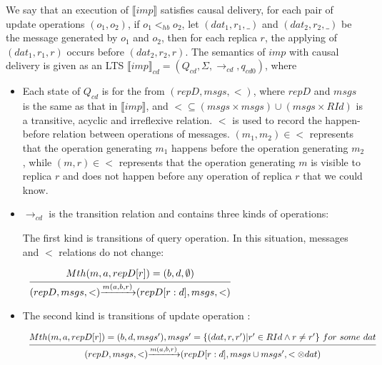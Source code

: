 We say that an execution of $\llbracket imp \rrbracket$ satisfies causal delivery, for each pair of update operations $(o_1,o_2)$, if $o_1 <_{hb} o_2$, let $(dat_1,r_1,\_)$ and $(dat_2,r_2,\_)$ be the message generated by $o_1$ and $o_2$, then for each replica $r$, the applying of $(dat_1,r_1,r)$ occurs before $(dat_2,r_2,r)$. The semantics of $imp$ with causal delivery is given as an LTS $\llbracket imp \rrbracket_{cd} = (Q_{cd},\Sigma,\rightarrow_{cd},q_{cd0})$, where

\begin {itemize}
\setlength{\itemsep}{0.5pt}
\item[-] Each state of $Q_{cd}$ is for the from $(repD,msgs,<)$, where $repD$ and $msgs$ is the same as that in $\llbracket imp \rrbracket$, and $< \subseteq (msgs \times msgs) \cup (msgs \times RId)$ is a transitive, acyclic and irreflexive relation. $<$ is used to record the happen-before relation between operations of messages. %
    $(m_1,m_2) \in <$ represents that the operation generating $m_1$ happens before the operation generating $m_2$, while $(m,r) \in <$ represents that the operation generating $m$ is visible to replica $r$ and does not happen before any operation of replica $r$ that we could know.

\item[-] $\rightarrow_{cd}$ is the transition relation and contains three kinds of operations:

    The first kind is transitions of query operation. In this situation, messages and $<$ relations do not change:

    $\begin{array}{l c} \bigfrac{ Mth(m,a,repD[r]) = (b,d,\emptyset)} {(repD,msgs,<) {\xrightarrow{m(a,b,r)}} (repD[r:d],msgs,<)} \end{array}$



\item[-] The second kind is transitions of update operation :

    $\begin{array}{l c} \bigfrac{ Mth(m,a,repD[r]) = (b,d,msgs'), msgs' = \{ (dat,r,r') \vert r' \in RId \wedge r \neq r' \} \ for \ some \ dat} {(repD,msgs,<) {\xrightarrow{m(a,b,r)}} (repD[r:d],msgs \cup msgs',< \otimes dat)} \end{array}$


\end{itemize}
